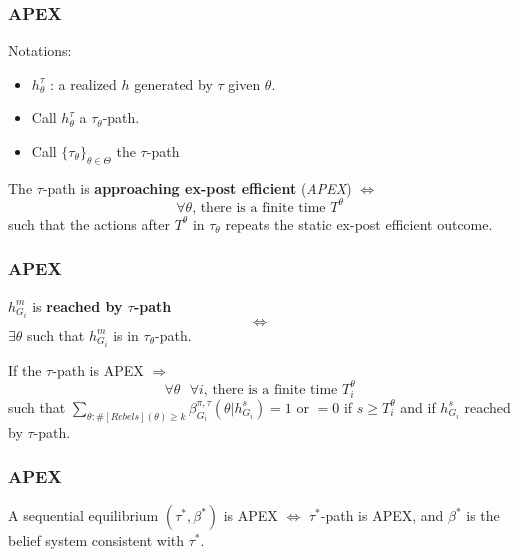 \documentclass[10pt]{beamer}
\begin{document}
\begin{frame}
  \frametitle{APEX}
Notations:
\begin{itemize}
\item $h^{\tau}_{\theta}$ : a realized $h$ generated by $\tau$ given $\theta$.
\item Call $h^{\tau}_{\theta}$ a $\tau_{\theta}$-path.
\item Call $\{\tau_{\theta}\}_{\theta\in \Theta}$ the $\tau$-path
\end{itemize}


\begin{definition}
The $\tau$-path is \textbf{approaching ex-post efficient} (\textit{APEX}) $\Leftrightarrow$ 
\[\text{$\forall\theta$,  there is a finite time $T^{\theta}$}\] 
such that the actions after $T^{\theta}$ in $\tau_{\theta}$ repeats the static ex-post efficient outcome.
\end{definition}
 


\end{frame}


\begin{frame}
  \frametitle{APEX}


\begin{definition}
$h^{m}_{G_i}$ is \textbf{reached by $\tau$-path} \[\Leftrightarrow\] $\exists \theta$ such that $h^{m}_{G_i}$ is in $\tau_{\theta}$-path.
\end{definition}
 
\begin{lemma}\label{lemma_learn}
If the $\tau$-path is APEX $\Rightarrow$
\[\text{$\forall\theta$ $\forall i$, there is a finite time $T^{\theta}_i$}\] 
such that $\sum_{\theta:\#[Rebels](\theta)\geq k}\beta^{\pi,\tau}_{G_i}(\theta|h^{s}_{G_i})=1$ or $=0$
if $s\geq T^{\theta}_i$ and if $h^{s}_{G_i}$ reached by $\tau$-path.
\end{lemma}

\end{frame}


\begin{frame}
  \frametitle{APEX}


\begin{definition}\label{Def_expost_efficient}
A sequential equilibrium $(\tau^{*},\beta^{*})$ is APEX $\Leftrightarrow$ $\tau^{*}$-path is APEX, and $\beta^{*}$ is the belief system consistent with $\tau^{*}$.

\end{definition}
 


\end{frame}
\end{document}
